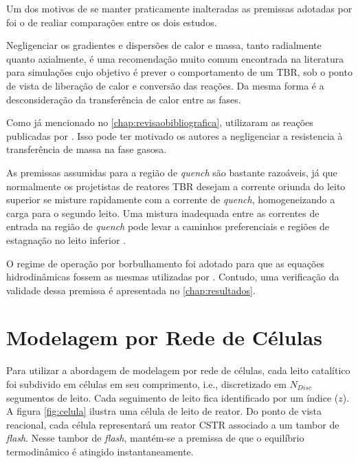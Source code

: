 Um dos motivos de se manter praticamente inalteradas as premissas adotadas por
 foi o de realiar comparações entre os dois estudos.

Negligenciar os gradientes e dispersões de calor e massa, tanto radialmente
quanto axialmente, é uma recomendação muito comum encontrada na literatura
\cite{Ancheyta2011, Ranade2011, Froment2011} para simulações cujo objetivo é
prever o comportamento de um TBR, sob o ponto de vista de liberação de calor e
conversão das reações. Da mesma forma é a desconsideração da transferência de
calor entre as fases.

Como já mencionado no \autoref{chap:revisaobibliografica},
 utilizaram as reações publicadas por
. Isso pode ter motivado os autores a negligenciar a
resistencia à transferência de massa na fase gasosa.

As premissas assumidas para a região de \emph{quench} são bastante razoáveis, já
que normalmente os projetistas de reatores TBR desejam a corrente oriunda do
leito superior se misture rapidamente com a corrente de \emph{quench},
homogeneizando a carga para o segundo leito. Uma mistura inadequada entre as
correntes de entrada na região de \emph{quench} pode levar a caminhos
preferenciais e regiões de estagnação no leito inferior \cite{Ancheyta2011}.

O regime de operação por borbulhamento foi adotado para que as
equações hidrodinâmicas fossem as mesmas utilizadas por .
Contudo, uma verificação da validade dessa premissa é apresentada no
\autoref{chap:resultados}.

\section{Modelagem por Rede de Células} \label{sec:modelagemredecelulas}

Para utilizar a abordagem de modelagem por rede de células, cada leito
catalítico foi subdivido em células em seu comprimento, i.e., discretizado em
$N_{Disc}$ segumentos de leito. Cada seguimento de leito fica identificado por
um índice ($z$). A figura \autoref{fig:celula} ilustra uma célula de leito de
reator. Do ponto de vista reacional, cada célula representará um reator CSTR
associado a um tambor de \emph{flash}. Nesse tambor de \emph{flash}, mantém-se a premissa
de que o equilíbrio termodinâmico é atingido instantaneamente.

